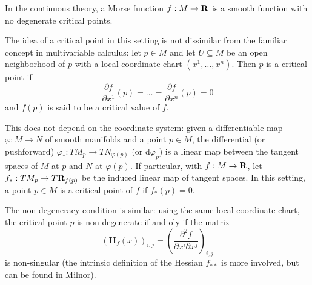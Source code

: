 \begin{remark}
    In the continuous theory, a Morse function $f : M \to \mathbf{R}$ is a smooth function with no degenerate critical points.

    The idea of a critical point in this setting is not dissimilar from the familiar concept in multivariable calculus: let $p \in M$ and let
    $U \subseteq M$ be an open neighborhood of $p$ with a local coordinate chart $(x^1, \dots, x^n)$. Then $p$ is a critical point if
    \[
        \frac{\partial f}{\partial x^1}(p) = \dots = \frac{\partial f}{\partial x^n}(p) = 0
    \]
    and $f(p)$ is said to be a critical value of $f$.

    This does not depend on the coordinate system: given a differentiable map $\varphi : M \to N$ of smooth manifolds and a point $p \in M$,
    the differential (or pushforward) $\varphi_* : TM_p \to TN_{\varphi(p)}$ (or $\text{d}\varphi_p$) is a linear map between the tangent spaces
    of $M$ at $p$ and $N$ at $\varphi(p)$. If particular, with $f : M \to \mathbf{R}$, let $f_* : TM_p \to T\mathbf{R}_{f(p)}$ be the induced linear map of tangent spaces.
    In this setting, a point $p \in M$ is a critical point of $f$ if $f_*(p) = 0$.

    The non-degeneracy condition is similar: using the same local coordinate chart, the critical point $p$ is non-degenerate if and oly if the matrix
    \[
        \left(\mathbf{H}_f(x)\right)_{i,j} = \left(\frac{\partial^2 f}{\partial x^i \partial x^j}\right)_{i,j}
    \]
    is non-singular (the intrinsic definition of the Hessian $f_{**}$ is more involved, but can be found in Milnor\autocite*{morsetheory}).
\end{remark}



